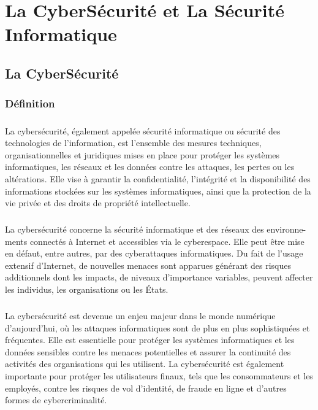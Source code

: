 \chapter{La CyberSécurité et La Sécurité Informatique}
\section{La CyberSécurité}
\subsection{Définition}
\paragraph{ }
La cybersécurité, également appelée sécurité informatique ou sécurité des technologies de l'information, est l'ensemble des mesures techniques, organisationnelles et juridiques mises en place pour protéger les systèmes informatiques, les réseaux et les données contre les attaques, les pertes ou les altérations. Elle vise à garantir la confidentialité, l'intégrité et la disponibilité des informations stockées sur les systèmes informatiques, ainsi que la protection de la vie privée et des droits de propriété intellectuelle.
\paragraph{ }
La cybersécurité concerne la sécurité informatique et des réseaux des environne-
ments connectés à Internet et accessibles via le cyberespace. Elle peut être mise en
défaut, entre autres, par des cyberattaques informatiques. Du fait de l’usage extensif
d’Internet, de nouvelles menaces sont apparues générant des risques additionnels
dont les impacts, de niveaux d’importance variables, peuvent affecter les individus,
les organisations ou les États. 
\paragraph{ }
La cybersécurité est devenue un enjeu majeur dans le monde numérique d'aujourd'hui, où les attaques informatiques sont de plus en plus sophistiquées et fréquentes. Elle est essentielle pour protéger les systèmes informatiques et les données sensibles contre les menaces potentielles et assurer la continuité des activités des organisations qui les utilisent. La cybersécurité est également importante pour protéger les utilisateurs finaux, tels que les consommateurs et les employés, contre les risques de vol d'identité, de fraude en ligne et d'autres formes de cybercriminalité.
